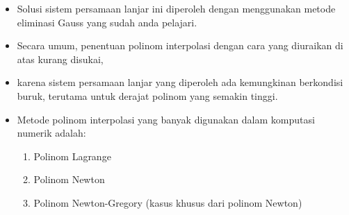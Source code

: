 \documentclass[pdflatex,compress,mathserif]{beamer}
\begin{document}
\begin{frame}
	\begin{itemize}
		\item Solusi sistem persamaan lanjar ini diperoleh dengan menggunakan metode eliminasi Gauss yang sudah anda pelajari.
		\item Secara umum, penentuan polinom interpolasi dengan cara yang diuraikan di atas kurang disukai,
		\item karena sistem persamaan lanjar yang diperoleh ada kemungkinan berkondisi buruk, terutama untuk derajat polinom yang semakin tinggi.
		\item Metode polinom interpolasi yang banyak digunakan dalam komputasi numerik adalah:
		\begin{enumerate}
			\item Polinom Lagrange
			\item Polinom Newton
			\item Polinom Newton-Gregory (kasus khusus dari polinom Newton)
		\end{enumerate}
	\end{itemize}
\end{frame}
\end{document}
